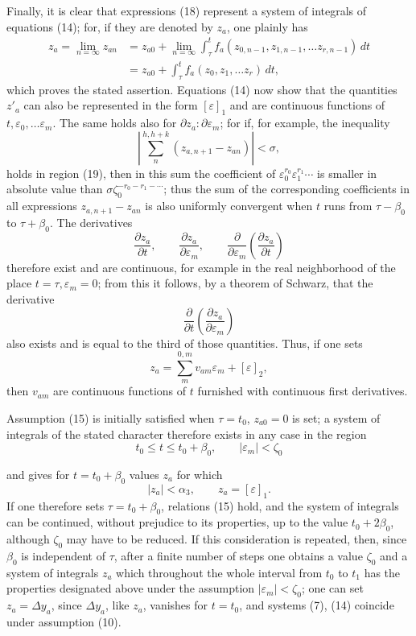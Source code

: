 \documentclass[11pt,a4paper,leqno]{article}
\begin{document}
Finally, it is clear that expressions (18) represent a system of integrals
of equations (14); for, if they are denoted by $z_a$, one plainly has
\[
\begin{aligned}
z_a=\lim_{n=\infty}z_{an}
&=z_{a0}+\lim_{n=\infty}\int_\tau^t
f_a(z_{0,n-1},z_{1,n-1},\ldots z_{r,n-1})\,dt\\
&=z_{a0}+\int_\tau^t f_a(z_0,z_1,\ldots z_r)\,dt,
\end{aligned}
\]
which proves the stated assertion. Equations (14) now show that the
quantities $z'_a$ can also be represented in the form $[\varepsilon]_1$
and are continuous functions of $t,\varepsilon_0,\ldots\varepsilon_m$.
The same holds also for $\partial z_a:\partial\varepsilon_m$; for if,
for example, the inequality
\[
\left|\sum_n^{h,h+k}(z_{a,n+1}-z_{an})\right|<\sigma,
\]
holds in region (19), then in this sum the coefficient of
$\varepsilon_0^{r_0}\varepsilon_1^{r_1}\cdots$ is smaller in absolute
value than $\sigma\zeta_0^{-r_0-r_1-\cdots}$; thus the sum of the
corresponding coefficients in all expressions $z_{a,n+1}-z_{an}$ is also
uniformly convergent when $t$ runs from $\tau-\beta_0$ to $\tau+\beta_0$.
The derivatives
\[
\frac{\partial z_a}{\partial t},\qquad
\frac{\partial z_a}{\partial\varepsilon_m},\qquad
\frac{\partial}{\partial\varepsilon_m}
\left(\frac{\partial z_a}{\partial t}\right)
\]
therefore exist and are continuous, for example in the real neighborhood
of the place $t=\tau,\varepsilon_m=0$; from this it follows, by a theorem
of Schwarz, that the derivative
\[
\frac{\partial}{\partial t}
\left(\frac{\partial z_a}{\partial\varepsilon_m}\right)
\]
also exists and is equal to the third of those quantities. Thus, if one
sets
\[
z_a=\sum_m^{0,m}v_{am}\varepsilon_m+[\varepsilon]_2,
\]
then $v_{am}$ are continuous functions of $t$ furnished with continuous
first derivatives.

Assumption (15) is initially satisfied when $\tau=t_0$, $z_{a0}=0$ is
set; a system of integrals of the stated character therefore exists in
any case in the region
\[
t_0\leq t\leq t_0+\beta_0,\qquad |\varepsilon_m|<\zeta_0
\]

and gives for $t=t_0+\beta_0$ values $z_a$ for which
\[
|z_a|<\alpha_3,\qquad z_a=[\varepsilon]_1.
\]
If one therefore sets $\tau=t_0+\beta_0$, relations (15) hold, and the
system of integrals can be continued, without prejudice to its properties,
up to the value $t_0+2\beta_0$, although $\zeta_0$ may have to be reduced.
If this consideration is repeated, then, since $\beta_0$ is independent of
$\tau$, after a finite number of steps one obtains a value $\zeta_0$ and a
system of integrals $z_a$ which throughout the whole interval from $t_0$
to $t_1$ has the properties designated above under the assumption
$|\varepsilon_m|<\zeta_0$; one can set $z_a=\Delta y_a$, since
$\Delta y_a$, like $z_a$, vanishes for $t=t_0$, and systems (7), (14)
coincide under assumption (10).
\end{document}
